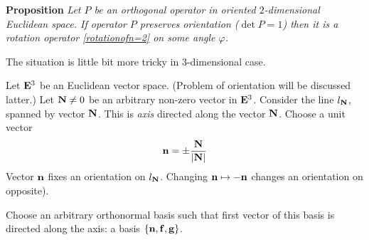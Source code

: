 \documentclass[12pt]{article}
\numberwithin{equation}{section}
\begin{document}
   {\bf Proposition} {\it Let $P$ be an orthogonal operator in oriented $2$-dimensional Euclidean space.
   If  operator $P$ preserves orientation ($\det P=1$) 
then it is a rotation operator \eqref{rotationofn=2}
   on some angle $\varphi$.}

\m

The situation is little bit more tricky in $3$-dimensional case.





Let ${\bf E}^3$ be an Euclidean vector space.
(Problem of orientation will be discussed latter.)
Let ${\bf N}\not=0$ be
 an arbitrary non-zero vector in ${\bf E}^3$.
Consider the line $l_{\bf N}$, spanned by vector ${\bf N}$.
 This is {\it axis} directed along the vector ${\bf N}$.
Choose a unit vector
          \begin{equation}\label{unitvectoEuler}
          {\bf n}=\pm {{\bf N}\over |{\bf N}|}
          \end{equation}
{\footnotesize Vector ${\bf n}$ fixes an orientation on $l_{\bf N}$. Changing
${\bf n}\mapsto-{\bf n} $ changes an orientation on opposite)}.




Choose an arbitrary orthonormal basis such that first vector of this basis
is directed along the axis: a basis $\{{\bf n},{\bf f},{\bf g}\}$.
\end{document}

